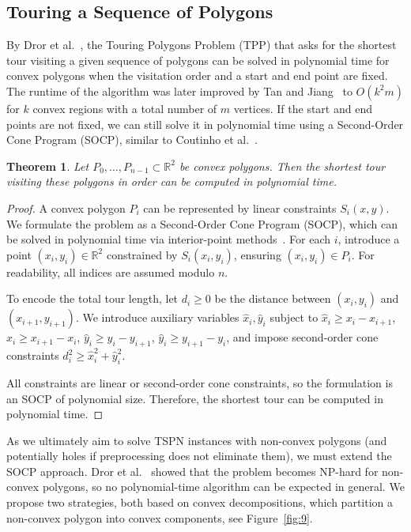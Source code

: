\documentclass[11pt,a4paper]{article}
\theoremstyle{plain}
\newtheorem{theorem}{Theorem}
\begin{document}
\subsection{Touring a Sequence of Polygons}
\label{sec:3.1}

By Dror et al.~\cite{ref20}, the Touring Polygons Problem (TPP) that asks for the shortest tour visiting a given sequence of polygons can be solved in polynomial time for convex polygons when the visitation order and a start and end point are fixed. The runtime of the algorithm was later improved by Tan and Jiang~\cite{ref42} to $O(k^2 m)$ for $k$ convex regions with a total number of $m$ vertices. If the start and end points are not fixed, we can still solve it in polynomial time using a Second-Order Cone Program (SOCP), similar to Coutinho et al.~\cite{ref13}.

\begin{theorem}
Let $P_0, \dots, P_{n-1} \subset \mathbb{R}^2$ be convex polygons. Then the shortest tour visiting these polygons in order can be computed in polynomial time.
\end{theorem}

\begin{proof}
A convex polygon $P_i$ can be represented by linear constraints $S_i(x,y)$. We formulate the problem as a Second-Order Cone Program (SOCP), which can be solved in polynomial time via interior-point methods~\cite{ref8}. For each $i$, introduce a point $(x_i, y_i) \in \mathbb{R}^2$ constrained by $S_i(x_i,y_i)$, ensuring $(x_i,y_i) \in P_i$. For readability, all indices are assumed modulo $n$.

To encode the total tour length, let $d_i \geq 0$ be the distance between $(x_i, y_i)$ and $(x_{i+1}, y_{i+1})$. We introduce auxiliary variables $\hat{x}_i, \hat{y}_i$ subject to $\hat{x}_i \geq x_i - x_{i+1}$, $\hat{x}_i \geq x_{i+1} - x_i$, $\hat{y}_i \geq y_i - y_{i+1}$, $\hat{y}_i \geq y_{i+1} - y_i$, and impose second-order cone constraints $d_i^2 \geq \hat{x}_i^2 + \hat{y}_i^2$.

All constraints are linear or second-order cone constraints, so the formulation is an SOCP of polynomial size. Therefore, the shortest tour can be computed in polynomial time.
\end{proof}

As we ultimately aim to solve TSPN instances with non-convex polygons (and potentially holes if preprocessing does not eliminate them), we must extend the SOCP approach. Dror et al.~\cite{ref20} showed that the problem becomes NP-hard for non-convex polygons, so no polynomial-time algorithm can be expected in general. We propose two strategies, both based on convex decompositions, which partition a non-convex polygon into convex components, see Figure~\ref{fig:9}.
\end{document}
